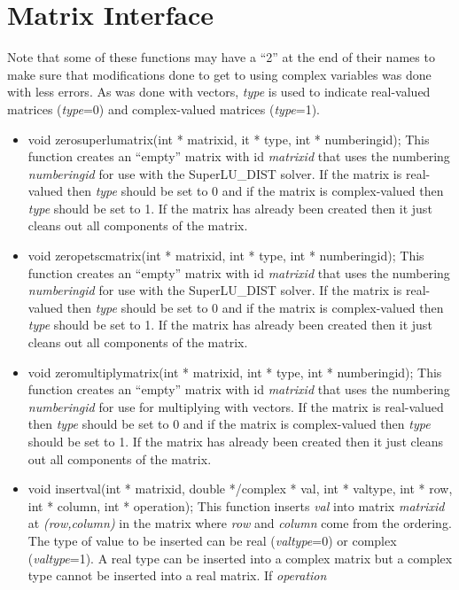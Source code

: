 \section{Matrix Interface}
Note that some of these functions may have a ``2'' at the end of their names to make sure
that modifications done to get to using complex variables was done with less errors. As was done with
vectors, \textit{type} is used to indicate real-valued matrices (\textit{type}=0) and complex-valued
matrices (\textit{type}=1).
\begin{itemize}
\item  void zerosuperlumatrix(int * matrixid, it * type, int * numberingid);  This function creates
an ``empty'' matrix with id \textit{matrixid} that uses the numbering \textit{numberingid}
for use with the SuperLU\_DIST solver.  If the matrix is real-valued then \textit{type}
should be set to 0 and if the matrix is complex-valued then \textit{type} should be set to 1. 
If the matrix has already been created then it just cleans out all components of the matrix.
\item  void zeropetscmatrix(int * matrixid, int * type, int * numberingid); This function creates
an ``empty'' matrix with id \textit{matrixid} that uses the numbering \textit{numberingid}
for use with the SuperLU\_DIST solver.  If the matrix is real-valued then \textit{type}
should be set to 0 and if the matrix is complex-valued then \textit{type} should be set to 1. 
If the matrix has already been created then it just cleans out all components of the matrix.
 \item void zeromultiplymatrix(int * matrixid, int * type, int * numberingid); This function creates
an ``empty'' matrix with id \textit{matrixid} that uses the numbering \textit{numberingid}
for use for multiplying with vectors.  If the matrix is real-valued then \textit{type}
should be set to 0 and if the matrix is complex-valued then \textit{type} should be set to 1. 
If the matrix has already been created then it just cleans out all components of the matrix.
\item  void insertval(int * matrixid, double */complex * val, int * valtype, int * row, 
		   int * column, int * operation);  This function inserts \textit{val} into
matrix \textit{matrixid} at \textit{(row,column)} in the matrix where \textit{row}
and \textit{column} come from the ordering.  The type of value to
 be inserted can be real (\textit{valtype}=0)
or complex (\textit{valtype}=1).  A real type can be inserted into a complex matrix but
a complex type cannot be inserted into a real matrix.  If \textit{operation}

\end{itemize}
